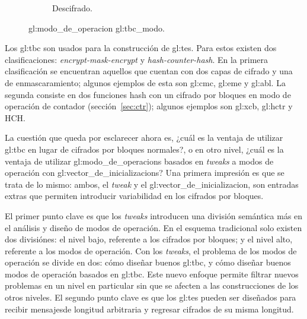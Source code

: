 \begin{figure}
\begin{subfigure}{0.45\textwidth}
\begin{center}
      \caption{Descifrado.}
    \end{center}
  \end{subfigure}
  \caption{\Gls{gl:modo_de_operacion} \gls{gl:tbc_modo}.}
  \label{figura:tbc}
\end{figure}

Los \gls{gl:tbc} son usados para la construcción de \gls{gl:tes}. Para estos
existen dos clasificaciones: \textit{encrypt-mask-encrypt} y
\textit{hash-counter-hash}. En la primera clasificación se encuentran aquellos
que cuentan con dos capas de cifrado y una de enmascaramiento; algunos ejemplos
de esta son \gls{gl:cmc}, \gls{gl:eme} y \gls{gl:abl}. La segunda consiste en
dos funciones hash con un cifrado por bloques en modo de operación de contador
(sección~\ref{sec:ctr}); algunos ejemplos son \gls{gl:xcb}, \gls{gl:hctr}
y HCH.


La cuestión que queda por esclarecer ahora es, ¿cuál es la ventaja de utilizar
\gls{gl:tbc} en lugar de cifrados por bloques normales?, o en otro nivel,
¿cuál es la ventaja de utilizar \glspl{gl:modo_de_operacion} basados en
\textit{tweaks} a modos de operación con \glspl{gl:vector_de_inicializacion}?
Una primera impresión es que se trata de lo mismo: ambos, el \textit{tweak} y
el \gls{gl:vector_de_inicializacion}, son entradas extras que permiten
introducir variabilidad en los cifrados por bloques.

El primer punto clave es que los \textit{tweaks} introducen una división
semántica más en el análisis y diseño de modos de operación. En el esquema
tradicional solo existen dos divisiónes: el nivel bajo, referente a los
cifrados por bloques; y el nivel alto, referente a los modos de operación. Con
los \textit{tweaks}, el problema de los modos de operación se divide en dos:
cómo diseñar buenos \gls{gl:tbc}, y cómo diseñar buenos modos de operación
basados en \gls{gl:tbc}. Este nuevo enfoque permite filtrar nuevos problemas
en un nivel en particular sin que se afecten a las construcciones de los otros
niveles. El segundo punto clave es que los \gls{gl:tes} pueden ser diseñados
para recibir mensajesde longitud arbitraria y regresar cifrados de su misma
longitud.
